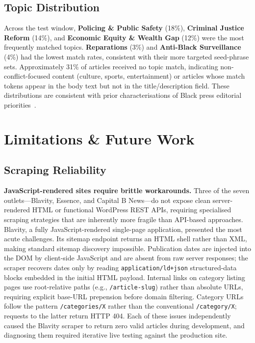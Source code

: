 \documentclass[sigconf,anonymous]{acmart}
\begin{document}
\subsection{Topic Distribution}

Across the test window, \textbf{Policing \& Public Safety} (18\%),
\textbf{Criminal Justice Reform} (14\%), and \textbf{Economic Equity \&
Wealth Gap} (12\%) were the most frequently matched topics.
\textbf{Reparations} (3\%) and \textbf{Anti-Black Surveillance} (4\%) had the
lowest match rates, consistent with their more targeted seed-phrase sets.
Approximately 31\% of articles received no topic match, indicating
non-conflict-focused content (culture, sports, entertainment) or articles whose
match tokens appear in the body text but not in the title/description field.
These distributions are consistent with prior characterisations of Black press
editorial priorities~\cite{mjelde2023international,gallon2021black}.

\section{Limitations \& Future Work}

\subsection{Scraping Reliability}

\noindent\textbf{JavaScript-rendered sites require brittle workarounds.}
Three of the seven outlets---Blavity, Essence, and Capital B News---do not expose
clean server-rendered HTML or functional WordPress REST APIs, requiring
specialised scraping strategies that are inherently more fragile than API-based
approaches.
Blavity, a fully JavaScript-rendered single-page application, presented the
most acute challenges.
Its sitemap endpoint returns an HTML shell rather than XML, making standard
sitemap discovery impossible.
Publication dates are injected into the DOM by client-side JavaScript and are
absent from raw server responses; the scraper recovers dates only by reading
\texttt{application/ld+json} structured-data blocks embedded in the initial
HTML payload.
Internal links on category listing pages use root-relative paths
(e.g., \texttt{/article-slug}) rather than absolute URLs, requiring explicit
base-URL prepension before domain filtering.
Category URLs follow the pattern \texttt{/categories/X} rather than the
conventional \texttt{/category/X}; requests to the latter return HTTP 404.
Each of these issues independently caused the Blavity scraper to return zero
valid articles during development, and diagnosing them required iterative
live testing against the production site.
\end{document}
